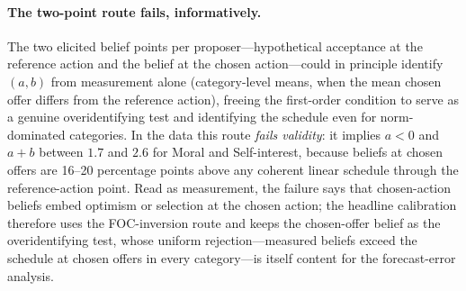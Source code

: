 \documentclass[11pt]{article}
\theoremstyle{plain}
\theoremstyle{remark}
\begin{document}
\paragraph{The two-point route fails, informatively.} The two elicited belief points per proposer---hypothetical acceptance at the reference action and the belief at the chosen action---could in principle identify $(a,b)$ from measurement alone (category-level means, when the mean chosen offer differs from the reference action), freeing the first-order condition to serve as a genuine overidentifying test and identifying the schedule even for norm-dominated categories. In the data this route \emph{fails validity}: it implies $a<0$ and $a+b$ between $1.7$ and $2.6$ for Moral and Self-interest, because beliefs at chosen offers are 16--20 percentage points above any coherent linear schedule through the reference-action point. Read as measurement, the failure says that chosen-action beliefs embed optimism or selection at the chosen action; the headline calibration therefore uses the FOC-inversion route and keeps the chosen-offer belief as the overidentifying test, whose uniform rejection---measured beliefs exceed the schedule at chosen offers in every category---is itself content for the forecast-error analysis.
\end{document}
